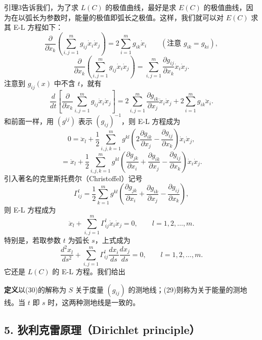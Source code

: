 引理3告诉我们，为了求 $L(C)$ 的极值曲线，最好是求 $E(C)$ 的极值曲线，因为在以弧长为参数时，能量的极值即弧长之极值。这样，我们就可以对 $E(C)$ 求其 E-L 方程如下：
\[
 \frac{\partial}{\partial\dot x_k}
 \left(\sum_{i,j=1}^{m}g_{ij}\dot x_i\dot x_j\right)
 =2\sum_{i=1}^{m}g_{ik}\dot x_i
 \qquad(\text{注意 }g_{ik}=g_{ki}),
\]
\[
 \frac{\partial}{\partial x_k}
 \left(\sum_{i,j=1}^{m}g_{ij}\dot x_i\dot x_j\right)
 =\sum_{i,j=1}^{m}\frac{\partial g_{ij}}{\partial x_k}\dot x_i\dot x_j.
\]
注意到 $g_{ij}(x)$ 中不含 $t$，就有
\[
 \frac d{dt}\left[
 \frac{\partial}{\partial\dot x_k}
 \sum_{i,j=1}^{m}g_{ij}\dot x_i\dot x_j\right]
 =2\sum_{i,j=1}^{m}\frac{\partial g_{ik}}{\partial x_j}\dot x_i\dot x_j
 +2\sum_{i=1}^{m}g_{ik}\ddot x_i.
\]
和前面一样，用 $(g^{ij})$ 表示 $(g_{ij})^{-1}$，则 E-L 方程成为
\[
 0=\ddot x_l+\frac12\sum_{i,j,k=1}^{m}g^{kl}
 \left(2\frac{\partial g_{ik}}{\partial x_j}-\frac{\partial g_{ij}}{\partial x_k}\right)
 \dot x_i\dot x_j,
\]
\[
 =\ddot x_l+\frac12\sum_{i,j,k=1}^{m}g^{kl}
 \left(\frac{\partial g_{jk}}{\partial x_i}
 +\frac{\partial g_{ik}}{\partial x_j}
 -\frac{\partial g_{ij}}{\partial x_k}\right)
 \dot x_i\dot x_j.
\]
引入著名的克里斯托费尔（Christoffel）记号
\begin{equation}
 \Gamma_{ij}^{l}=\frac12\sum_{k=1}^{m}g^{kl}
 \left(\frac{\partial g_{jk}}{\partial x_i}
 +\frac{\partial g_{ik}}{\partial x_j}
 -\frac{\partial g_{ij}}{\partial x_k}\right),
 \tag{28}
\end{equation}
则 E-L 方程成为
\begin{equation}
 \ddot x_l+\sum_{i,j=1}^{m}\Gamma_{ij}^{l}\dot x_i\dot x_j=0,
 \qquad l=1,2,\ldots,m.
 \tag{29}
\end{equation}
特别是，若取参数 $t$ 为弧长 $s$，上式成为
\begin{equation}
 \frac{d^2x_l}{ds^2}+\sum_{i,j=1}^{m}\Gamma_{ij}^{l}
 \frac{dx_i}{ds}\frac{dx_j}{ds}=0,
 \qquad l=1,2,\ldots,m.
 \tag{30}
\end{equation}
它还是 $L(C)$ 的 E-L 方程。我们给出

\noindent\textbf{定义}\quad 以(30)的解称为 $S$ 关于度量 $(g_{ij})$ 的测地线；(29)则称为关于能量的测地线。当 $t$ 即 $s$ 时，这两种测地线是一致的。

\subsection*{5. 狄利克雷原理（Dirichlet principle）}

